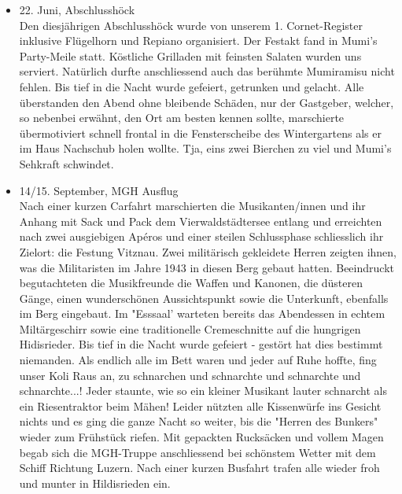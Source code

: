 \begin{history}
\begin{itemize}
            \item 22. Juni, Abschlusshöck\\
                  Den diesjährigen Abschlusshöck wurde von unserem 1. Cornet-Register
                  inklusive Flügelhorn und Repiano organisiert. Der Festakt fand in Mumi's
                  Party-Meile statt. Köstliche Grilladen mit feinsten Salaten wurden uns
                  serviert. Natürlich durfte anschliessend auch das berühmte Mumiramisu
                  nicht fehlen. Bis tief in die Nacht wurde gefeiert, getrunken und
                  gelacht. Alle überstanden den Abend ohne bleibende Schäden, nur der
                  Gastgeber, welcher, so nebenbei erwähnt, den Ort am besten kennen
                  sollte, marschierte übermotiviert schnell frontal in die Fensterscheibe
                  des Wintergartens als er im Haus Nachschub holen wollte. Tja, eins zwei
                  Bierchen zu viel und Mumi's Sehkraft schwindet.

            \item 14/15. September, MGH Ausflug\\
                  Nach einer kurzen Carfahrt marschierten die Musikanten/innen und ihr
                  Anhang mit Sack und Pack dem Vierwaldstädtersee entlang und erreichten
                  nach zwei ausgiebigen Apéros und einer steilen Schlussphase schliesslich
                  ihr Zielort: die Festung Vitznau. Zwei militärisch gekleidete Herren
                  zeigten ihnen, was die Militaristen im Jahre 1943 in diesen Berg gebaut
                  hatten. Beeindruckt begutachteten die Musikfreunde die Waffen und
                  Kanonen, die düsteren Gänge, einen wunderschönen Aussichtspunkt sowie
                  die Unterkunft, ebenfalls im Berg eingebaut. Im "Esssaal' warteten
                  bereits das Abendessen in echtem Miltärgeschirr sowie eine traditionelle
                  Cremeschnitte auf die hungrigen Hidisrieder. Bis tief in die Nacht wurde
                  gefeiert - gestört hat dies bestimmt niemanden. Als endlich alle im Bett
                  waren und jeder auf Ruhe hoffte, fing unser Koli Raus an, zu schnarchen
                  und schnarchte und schnarchte und schnarchte...! Jeder staunte, wie so
                  ein kleiner Musikant lauter schnarcht als ein Riesentraktor beim Mähen!
                  Leider nützten alle Kissenwürfe ins Gesicht nichts und es ging die ganze
                  Nacht so weiter, bis die "Herren des Bunkers" wieder zum Frühstück
                  riefen. Mit gepackten Rucksäcken und vollem Magen begab sich die
                  MGH-Truppe anschliessend bei schönstem Wetter mit dem Schiff Richtung
                  Luzern. Nach einer kurzen Busfahrt trafen alle wieder froh und munter in
                  Hildisrieden ein.


\end{itemize}
\end{history}
